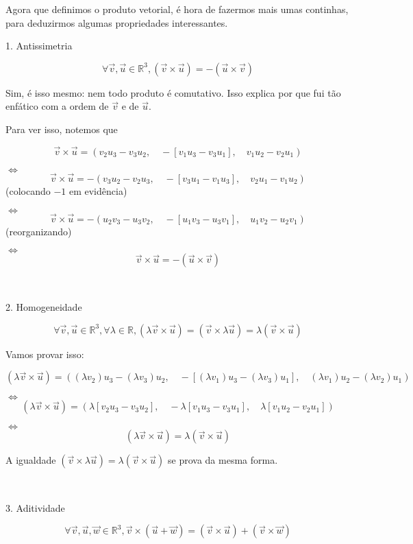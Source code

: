 Agora que definimos o produto vetorial, é hora de fazermos mais umas continhas, para deduzirmos algumas propriedades interessantes.

1. Antissimetria

\[\forall \vec{v}, \vec{u} \in \mathbb{R}^3, (\vec{v} \times \vec{u}) = - (\vec{u} \times \vec{v})
\]

Sim, é isso mesmo: nem todo produto é comutativo. Isso explica por que fui tão enfático com a ordem de \(\vec{v}\) e de \(\vec{u}\).

Para ver isso, notemos que

\[
\vec{v} \times \vec{u} = (v_2u_3 - v_3u_2,\quad -[v_1u_3 - v_3u_1],\quad v_1u_2 - v_2u_1)
\]

\(\Longleftrightarrow\) \[
\vec{v} \times \vec{u} = - (v_3u_2 - v_2u_3,\quad -[v_3u_1 - v_1u_3],\quad v_2u_1 - v_1u_2)
\] (colocando \(-1\) em evidência)

\(\Longleftrightarrow\) \[
\vec{v} \times \vec{u} = - (u_2v_3 - u_3v_2,\quad -[u_1v_3 - u_3v_1],\quad u_1v_2 - u_2v_1)
\] (reorganizando)

\(\Longleftrightarrow\) \[
\vec{v} \times \vec{u} = - (\vec{u} \times \vec{v})
\]

 

2. Homogeneidade

\[\forall \vec{v}, \vec{u} \in \mathbb{R}^3, \forall \lambda \in \mathbb{R}, (\lambda\vec{ v} \times \vec{u}) = (\vec{v} \times \lambda\vec{u}) = \lambda(\vec{v} \times \vec{u})
\]

Vamos provar isso:

\[
\left(\lambda\vec{v} \times \vec{u}\right) = ((\lambda v_2)u_3 - (\lambda v_3)u_2,\quad -[(\lambda v_1)u_3 - (\lambda v_3)u_1],\quad (\lambda v_1)u_2 - (\lambda v_2)u_1)
\]

\(\Longleftrightarrow\) \[
\left(\lambda\vec{v} \times \vec{u}\right) = (\lambda [v_2u_3 - v_3u_2],\quad -\lambda [v_1u_3 - v_3u_1],\quad \lambda [v_1u_2 - v_2u_1])
\]

\(\Longleftrightarrow\) \[
\left(\lambda\vec{v} \times \vec{u}\right) = \lambda (\vec{v} \times \vec{u})
\]

A igualdade \(\left(\vec{v} \times \lambda\vec{u}\right) = \lambda (\vec{v} \times \vec{u})\) se prova da mesma forma.

 

3. Aditividade

\[
\forall \vec{v}, \vec{u}, \vec{w} \in \mathbb{R}^3, \vec{v} \times (\vec{u} + \vec{w}) = (\vec{v} \times \vec{u}) + (\vec{v} \times \vec{w})
\]

